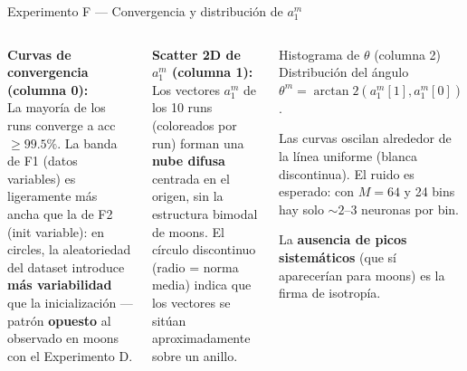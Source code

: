 \documentclass[10pt]{beamer}
\begin{document}
\begin{frame}{Experimento F — Convergencia y distribución de $a_1^m$}
\small
\begin{columns}

\textbf{Curvas de convergencia (columna 0):}\\
La mayoría de los runs converge a acc~$\geq 99.5\%$. La banda de F1 (datos variables) es ligeramente más ancha que la de F2 (init variable): en circles, la aleatoriedad del dataset introduce \textbf{más variabilidad} que la inicialización — patrón \textbf{opuesto} al observado en moons con el Experimento D.

\bigskip
\textbf{Scatter 2D de $a_1^m$ (columna 1):}\\
Los vectores $a_1^m$ de los 10 runs (coloreados por run) forman una \textbf{nube difusa} centrada en el origen, sin la estructura bimodal de moons. El círculo discontinuo (radio = norma media) indica que los vectores se sitúan aproximadamente sobre un anillo.

\begin{block}{Histograma de $\theta$ (columna 2)}
  Distribución del ángulo $\theta^m = \arctan2(a_1^m[1], a_1^m[0])$.

  \medskip
  Las curvas oscilan alrededor de la línea uniforme (blanca discontinua). El ruido es esperado: con $M=64$ y 24 bins hay solo $\sim 2$--$3$ neuronas por bin.

  \medskip
  La \textbf{ausencia de picos sistemáticos} (que sí aparecerían para moons) es la firma de isotropía.
\end{block}
\end{columns}

\end{frame}
\end{document}
